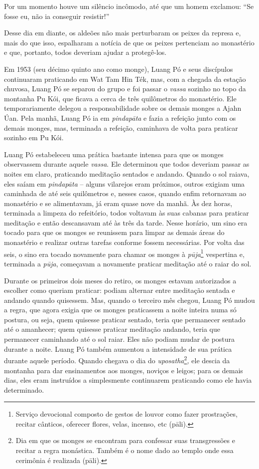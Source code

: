 Por um momento houve um silêncio incômodo, até que um homem exclamou:
``Se fosse eu, não ia conseguir resistir!''

Desse dia em diante, os aldeões não mais perturbaram os peixes da
represa e, mais do que isso, espalharam a notícia de que os peixes
pertenciam ao monastério e que, portanto, todos deveriam ajudar a
protegê-los.

Em 1953 (seu décimo quinto ano como monge), Luang Pó e seus discípulos
continuaram praticando em Wat Tam Hin Ték, mas, com a chegada da estação
chuvosa, Luang Pó se separou do grupo e foi passar o \emph{vassa}
sozinho no topo da montanha Pu Kói, que ficava a cerca de três
quilômetros do monastério. Ele temporariamente delegou a
responsabilidade sobre os demais monges a Ajahn Úan. Pela manhã, Luang
Pó ia em \emph{pindapāta} e fazia a refeição junto com os demais monges,
mas, terminada a refeição, caminhava de volta para praticar sozinho em
Pu Kói.

Luang Pó estabeleceu uma prática bastante intensa para que os monges
observassem durante aquele \emph{vassa}. Ele determinou que todos
deveriam passar as noites em claro, praticando meditação sentados e
andando. Quando o sol raiava, eles saíam em \emph{pindapāta} -- alguns
vilarejos eram próximos, outros exigiam uma caminhada de até seis
quilômetros e, nesses casos, quando enfim retornavam ao monastério e se
alimentavam, já eram quase nove da manhã. Às dez horas, terminada a
limpeza do refeitório, todos voltavam às suas cabanas para praticar
meditação e então descansavam até às três da tarde. Nesse horário, um
sino era tocado para que os monges se reunissem para limpar as demais
áreas do monastério e realizar outras tarefas conforme fossem
necessárias. Por volta das seis, o sino era tocado novamente para chamar
os monges à \emph{pūja}\footnote{Serviço devocional composto de gestos
  de louvor como fazer prostrações, recitar cânticos, oferecer flores,
  velas, incenso, etc (pāli).} vespertina e, terminada a \emph{pūja},
começavam a novamente praticar meditação até o raiar do sol.

Durante os primeiros dois meses do retiro, os monges estavam autorizados
a escolher como queriam praticar: podiam alternar entre meditação
sentada e andando quando quisessem. Mas, quando o terceiro mês chegou,
Luang Pó mudou a regra, que agora exigia que os monges praticassem a
noite inteira numa só postura, ou seja, quem quisesse praticar sentado,
teria que permanecer sentado até o amanhecer; quem quisesse praticar
meditação andando, teria que permanecer caminhando até o sol raiar. Eles
não podiam mudar de postura durante a noite. Luang Pó também aumentou a
intensidade de sua prática durante aquele período. Quando chegava o dia
do \emph{uposatha}\footnote{Dia em que os monges se encontram para
  confessar suas transgressões e recitar a regra monástica. Também é o
  nome dado ao templo onde essa cerimônia é realizada (pāli).}\emph{,}
ele descia da montanha para dar ensinamentos aos monges, noviços e
leigos; para os demais dias, eles eram instruídos a simplesmente
continuarem praticando como ele havia determinado.

